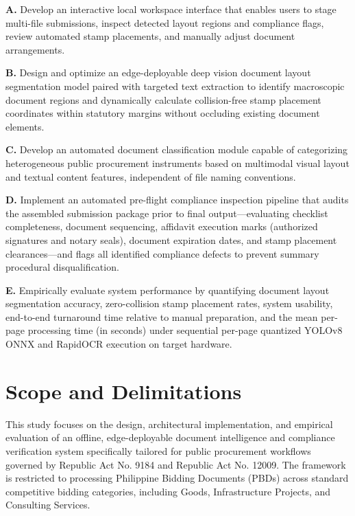 \noindent\textbf{A.} Develop an interactive local workspace interface that enables users to stage multi-file submissions, inspect detected layout regions and compliance flags, review automated stamp placements, and manually adjust document arrangements.

\noindent\textbf{B.} Design and optimize an edge-deployable deep vision document layout segmentation model paired with targeted text extraction to identify macroscopic document regions and dynamically calculate collision-free stamp placement coordinates within statutory margins without occluding existing document elements.

\noindent\textbf{C.} Develop an automated document classification module capable of categorizing heterogeneous public procurement instruments based on multimodal visual layout and textual content features, independent of file naming conventions.

\noindent\textbf{D.} Implement an automated pre-flight compliance inspection pipeline that audits the assembled submission package prior to final output—evaluating checklist completeness, document sequencing, affidavit execution marks (authorized signatures and notary seals), document expiration dates, and stamp placement clearances—and flags all identified compliance defects to prevent summary procedural disqualification.

\noindent\textbf{E.} Empirically evaluate system performance by quantifying document layout segmentation accuracy, zero-collision stamp placement rates, system usability, end-to-end turnaround time relative to manual preparation, and the mean per-page processing time (in seconds) under sequential per-page quantized YOLOv8 ONNX and RapidOCR execution on target hardware.

\section{Scope and Delimitations}
\label{sec:scope_and_delimitations}
This study focuses on the design, architectural implementation, and empirical evaluation of an offline, edge-deployable document intelligence and compliance verification system specifically tailored for public procurement workflows governed by Republic Act No. 9184 and Republic Act No. 12009.
The framework is restricted to processing Philippine Bidding Documents (PBDs) across standard competitive bidding categories, including Goods, Infrastructure Projects, and Consulting Services.

